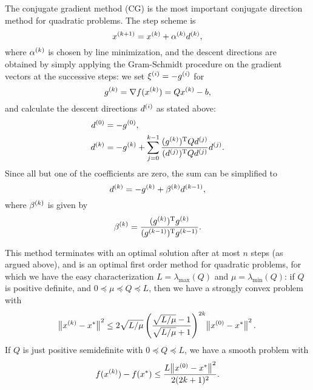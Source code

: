 \documentclass{article}
\begin{document}
\label{s:conjugate-gradient-method}

The conjugate gradient method (CG) is the most important conjugate direction method for quadratic
problems.  The step scheme is
\begin{equation*}
  \kth[k+1]{x} = \kth{x} + \kth{\alpha}\kth{d},
\end{equation*}
where \(\kth{\alpha}\) is chosen by line minimization, and the descent directions are obtained by
simply applying the Gram-Schmidt procedure on the gradient vectors at the successive steps: we set
\(\kth[i]{\xi} = -\kth[i]{g}\) for
\begin{equation*}
  \kth{g} = \nabla f(\kth{x}) = Q \kth{x} - b,
\end{equation*}
and calculate the descent directions \(\kth[i]{d}\) as stated above:
\begin{align*}
  \kth[0]{d} &= -\kth[0]{g}, \\
  \kth[k]{d} &= -\kth[k]{g} + \sum_{j=0}^{k-1}
               \frac{\T{(\kth[k]{g})} Q \kth[j]{d}}{\T{(\kth[j]{d})} Q \kth[j]{d}} \kth[j]{d}.
\end{align*}
Since all but one of the coefficients are zero, the sum can be simplified to
\begin{equation*}
  \kth{d} = -\kth{g} + \kth{\beta}\kth[k-1]{d},
\end{equation*}
where \(\kth{\beta}\) is given by
\begin{equation*}
  \kth{\beta} = \frac{\T{(\kth{g})}\kth{g}}{\T{(\kth[k-1]{g})}\kth[k-1]{g}}.
\end{equation*}

This method terminates with an optimal solution after at most \(n\) steps (as argued above), and is
an optimal first order method for quadratic problems, for which we have the easy characterization
\(L = \lambda_{\text{max}}(Q)\) and \(\mu = \lambda_{\text{min}}(Q)\): if \(Q\) is positive
definite, and \(0 \preceq \mu \preceq Q \preceq L\), then we have a strongly convex problem with
\begin{equation*}
  \enVert[1]{\kth{x} - x^*}^2 \leq 2\sqrt{L/\mu} \left( \frac{\sqrt{L/\mu}-1}{\sqrt{L/\mu}+1} \right)^{2k}
  \enVert[1]{\kth[0]{x} - x^*}^2.
\end{equation*}
If \(Q\) is just positive semidefinite with \(0 \preceq Q \preceq L\), we have a smooth problem with
\begin{equation*}
  f(\kth{x}) - f(x^*) \leq \frac{L \enVert[1]{\kth[0]{x} - x^*}^2}{2 (2k + 1)^2}.
\end{equation*}
\end{document}
